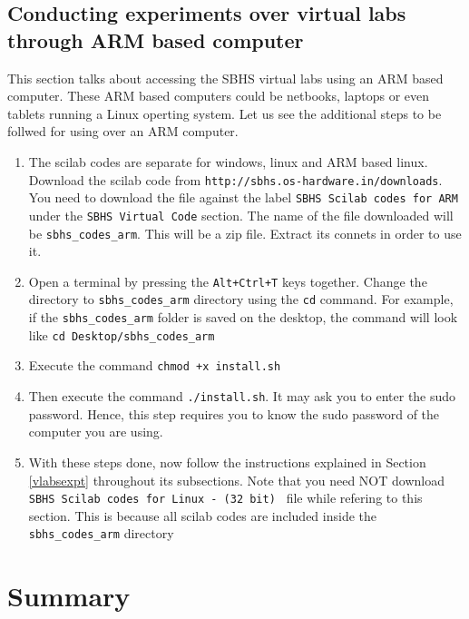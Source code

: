 \subsection{Conducting experiments over virtual labs through ARM based computer}
This section talks about accessing the SBHS virtual labs using an ARM based computer. These ARM based computers could be netbooks, laptops or even tablets running a Linux operting system. Let us see the additional steps to be follwed for using over an ARM computer.
\begin{enumerate}
\item The scilab codes are separate for windows, linux and ARM based linux. Download the scilab code from {\tt http://sbhs.os-hardware.in/downloads}. You need to download the file against the label {\tt SBHS Scilab codes for ARM} under the {\tt SBHS Virtual Code} section. The name of the file downloaded will be {\tt sbhs\_codes\_arm}. This will be a zip file. Extract its connets in order to use it.
\item Open a terminal by pressing the {\tt Alt+Ctrl+T} keys together. Change the directory to {\tt sbhs\_codes\_arm} directory using the {\tt cd} command. For example, if the {\tt sbhs\_codes\_arm} folder is saved on the desktop, the command will look like {\tt cd Desktop/sbhs\_codes\_arm}
\item Execute the command {\tt chmod +x install.sh} 
\item Then execute the command {\tt ./install.sh}. It may ask you to enter the sudo password. Hence, this step requires you to know the sudo password of the computer you are using.
\item With these steps done, now follow the instructions explained in Section \ref{vlabsexpt} throughout its subsections. Note that you need NOT download {\tt SBHS Scilab codes for Linux - (32 bit)
} file while refering to this section. This is because all scilab codes are included inside the {\tt sbhs\_codes\_arm} directory
\end{enumerate}
\section{Summary}\label{virtual-summary}

